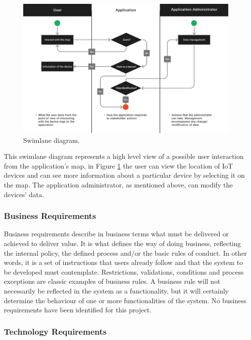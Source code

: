 \begin{figure}[H]
    \centering
    \includegraphics[width=15cm]{../app/docs/software_requirements/assets/images/swimlane_diagram.png}
    \caption{Swimlane diagram.}
    \label{fig:diagram swimlane}
\end{figure}

This swimlane diagram represents a high level view of a possible user interaction
from the application's map, in Figure \ref{fig:diagram swimlane} the user can view the location of
IoT devices and can see more information about a particular device by selecting
it on the map. The application administrator, as mentioned above, can modify the
devices' data.

\subsubsection{Business Requirements}

Business requirements describe in business terms what must be delivered
or achieved to deliver value. It is what defines the way of doing business,
reflecting the internal policy, the defined process and/or the basic rules
of conduct.  In other words, it is a set of instructions that users already
follow and that the system to be developed must contemplate. Restrictions,
validations, conditions and process exceptions are classic examples of business
rules. A business rule will not necessarily be reflected in the system as
a functionality, but it will certainly determine the behaviour of one or
more functionalities of the system.
\newline
No business requirements have been identified for this project.

\subsubsection{Technology Requirements}

